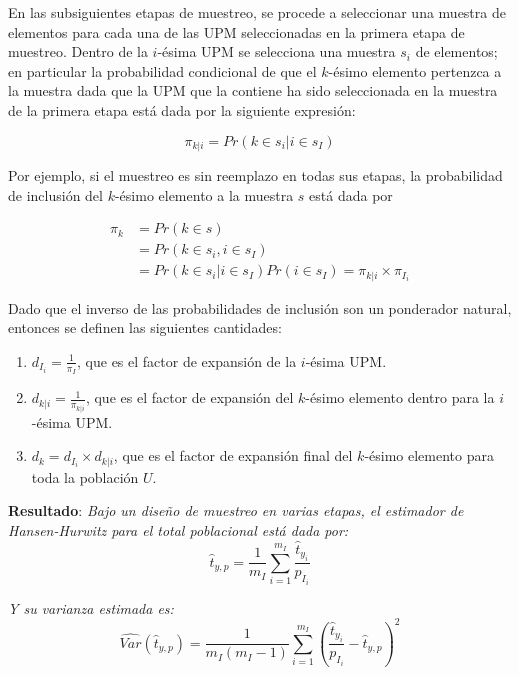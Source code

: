 En las subsiguientes etapas de muestreo, se procede a seleccionar una muestra de elementos para cada una de las UPM seleccionadas en la primera etapa de muestreo. Dentro de la \(i\)-ésima UPM se selecciona una muestra \(s_i\) de elementos; en particular la probabilidad condicional de que el \(k\)-ésimo elemento pertenzca a la muestra dada que la UPM que la contiene ha sido seleccionada en la muestra de la primera etapa está dada por la siguiente expresión:

\begin{equation*}
\pi_{k|i} = Pr(k \in s_i | i \in s_I)
\end{equation*}

Por ejemplo, si el muestreo es sin reemplazo en todas sus etapas, la probabilidad de inclusión del \(k\)-ésimo elemento a la muestra \(s\) está dada por

\begin{align*}
\label{piki}
\pi_k & = Pr(k \in s)\\ 
& = Pr(k \in s_i, i \in s_I) \\
& = Pr(k \in s_i | i \in s_I) Pr(i \in s_I) = \pi_{k|i} \times \pi_{I_i}
\end{align*}

Dado que el inverso de las probabilidades de inclusión son un ponderador natural, entonces se definen las siguientes cantidades:

\begin{enumerate}
\def\labelenumi{\arabic{enumi}.}
\tightlist
\item
  \(d_{I_i} = \frac{1}{\pi_I}\), que es el factor de expansión de la \(i\)-ésima UPM.
\item
  \(d_{k|i} = \frac{1}{\pi_{k|i}}\), que es el factor de expansión del \(k\)-ésimo elemento dentro para la \(i\)-ésima UPM.
\item
  \(d_k = d_{I_i} \times d_{k|i}\), que es el factor de expansión final del \(k\)-ésimo elemento para toda la población \(U\).
\end{enumerate}

\textbf{Resultado}: \emph{Bajo un diseño de muestreo en varias etapas, el estimador de Hansen-Hurwitz para el total poblacional está dada por:}
\begin{equation}
\label{HH}
\hat{t}_{y,p}=\frac{1}{m_I}\sum_{i=1}^{m_I}\frac{\hat{t}_{y_i}}{p_{I_i}}
\end{equation}

\emph{Y su varianza estimada es:}
\begin{equation}
\label{var}
\widehat{Var}(\hat{t}_{y,p})=\frac{1}{m_I(m_I-1)}\sum_{i=1}^{m_I}\left(\frac{\hat{t}_{y_i}}{p_{I_i}}-\hat{t}_{y,p}\right)^2
\end{equation}

